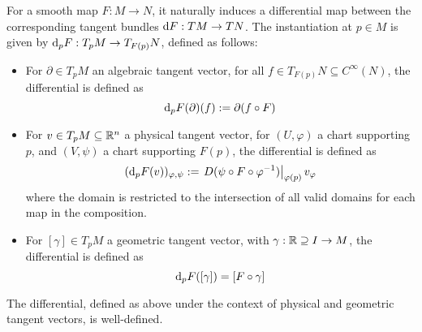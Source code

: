 \documentclass{article}
\begin{document}
\begin{definition}[Differential]
    For a smooth map $F: M \to N$, it naturally induces a differential map between the corresponding tangent bundles $\mathrm{d} F : TM \to TN$. The instantiation at $p \in M$ is given by $\mathrm{d}_p F: T_pM \to T_{F(p)}N$, defined as follows:
    \begin{itemize}
        \item For $\partial \in T_p M$ an algebraic tangent vector, for all $f \in T_{F(p)} N \subseteq C^{\infty}(N)$, the differential is defined as 
        \[
            \mathrm{d}_p F (\partial) (f) := \partial(f \circ F)
        \]
        \item For $v \in T_p M \subseteq \mathbb{R}^n$ a physical tangent vector, for $(U, \varphi)$ a chart supporting $p$, and $(V, \psi)$ a chart supporting $F(p)$, the differential is defined as
        \[
            (\mathrm{d}_p F(v))_{\varphi, \psi} := \left.D(\psi \circ F \circ \varphi^{-1})\right|_{\varphi(p)} v_{\varphi}
        \]
        where the domain is restricted to the intersection of all valid domains for each map in the composition.
        \item For $[\gamma] \in T_p M$ a geometric tangent vector, with $\gamma : \mathbb{R} \supseteq I \to M$, the differential is defined as
        \[
            \mathrm{d}_p F([\gamma]) = [F \circ \gamma]
        \]
    \end{itemize}
\end{definition}

\begin{proposition}
    The differential, defined as above under the context of physical and geometric tangent vectors, is well-defined.
\end{proposition}
\end{document}
